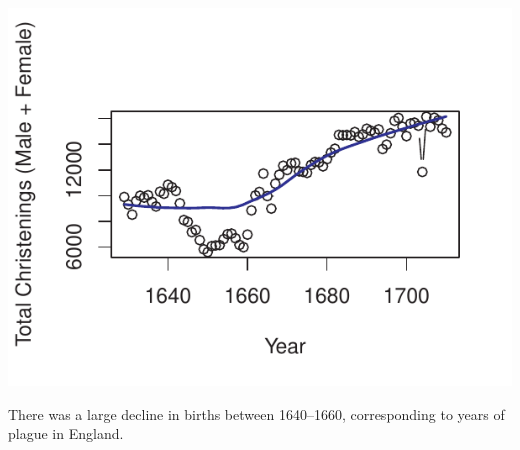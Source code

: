 \documentclass[11pt]{report}\usepackage[]{graphicx}\usepackage[]{color}
\newenvironment{knitrout}{}{} %
\renewenvironment{knitrout}{\small\renewcommand{\baselinestretch}{.85}}{} %
\begin{document}
\begin{Exercises}
\begin{enumerate*}
\begin{ans}
\begin{knitrout}
\centerline{\includegraphics{soln/fig/ex3_1b-1} }



\end{knitrout}
			
			There was a large decline in births between 1640--1660, corresponding to years of plague in England.
	    \end{ans}
	    
	  \end{enumerate*}


\end{Exercises}
\end{document}
